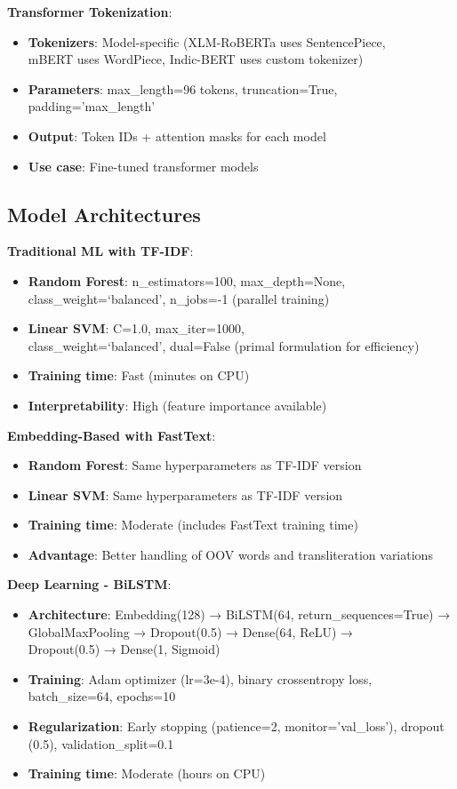 \documentclass[11pt]{article}
\begin{document}
\textbf{Transformer Tokenization}:
\begin{itemize}
\item \textbf{Tokenizers}: Model-specific (XLM-RoBERTa uses SentencePiece,\\ mBERT uses WordPiece, Indic-BERT uses custom tokenizer)
\item \textbf{Parameters}: max\_length=96 tokens, truncation=True,\\ padding='max\_length'
\item \textbf{Output}: Token IDs + attention masks for each model
\item \textbf{Use case}: Fine-tuned transformer models
\end{itemize}

\subsection{Model Architectures}

\textbf{Traditional ML with TF-IDF}: 
\begin{itemize}
\item \textbf{Random Forest}: n\_estimators=100, max\_depth=None,\\ class\_weight=`balanced', n\_jobs=-1 (parallel training)
\item \textbf{Linear SVM}: C=1.0, max\_iter=1000,\\ class\_weight=`balanced', dual=False (primal formulation for efficiency)
\item \textbf{Training time}: Fast (minutes on CPU)
\item \textbf{Interpretability}: High (feature importance available)
\end{itemize}

\textbf{Embedding-Based with FastText}:
\begin{itemize}
\item \textbf{Random Forest}: Same hyperparameters as TF-IDF version
\item \textbf{Linear SVM}: Same hyperparameters as TF-IDF version
\item \textbf{Training time}: Moderate (includes FastText training time)
\item \textbf{Advantage}: Better handling of OOV words and transliteration variations
\end{itemize}

\textbf{Deep Learning - BiLSTM}:
\begin{itemize}
\item \textbf{Architecture}: Embedding(128) → BiLSTM(64, return\_sequences=True) →\\ GlobalMaxPooling → Dropout(0.5) → Dense(64, ReLU) →\\ Dropout(0.5) → Dense(1, Sigmoid)
\item \textbf{Training}: Adam optimizer (lr=3e-4), binary crossentropy loss, batch\_size=64, epochs=10
\item \textbf{Regularization}: Early stopping (patience=2, monitor='val\_loss'), dropout (0.5), validation\_split=0.1
\item \textbf{Training time}: Moderate (hours on CPU)
\end{itemize}
\end{document}

